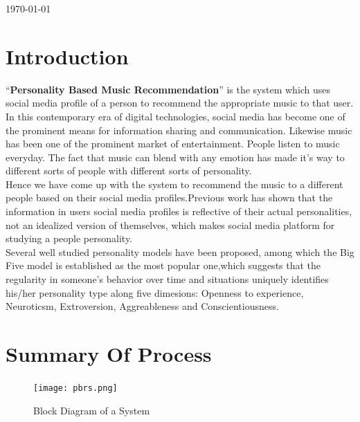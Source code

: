 \documentclass[a4paper, 12pt, onepage]{article}
\begin{document}
\begin{titlepage}
	{\normalsize \today\par}
      \end{titlepage}

      \setcounter{page}{2}
      \cleardoublepage
      {
        \setlength{\parskip}{0em}
        \renewcommand\contentsname{Table of Contents}
        \tableofcontents {}
      }


      \cleardoublepage
      \section{Introduction}
	``\textbf{Personality Based Music Recommendation}'' is the system which uses social media profile of a person to recommend the appropriate music to that user. In this contemporary era of digital technologies, social media has become one of the prominent means for information sharing and communication. Likewise music has been one of the prominent market of entertainment. People listen to music everyday. The fact that music can blend with any emotion has made it's way to different sorts of people with different sorts of personality.\\
	Hence we have come up with the system to recommend the music to a different people based on their social media profiles.Previous work has shown that the information in users social media profiles is reflective of their actual personalities, not an idealized version of themselves, which makes social media platform for studying a people personality.\\
	Several well studied personality models have been proposed, among which the Big Five model is established as the most popular one,which suggests that the regularity in someone's behavior over time and situations uniquely identifies his/her personality type along five dimesions: Openness to experience, Neuroticsm, Extroversion, Aggreableness and Conscientiousness.

      \cleardoublepage
      \section{Summary Of Process}
      \begin{figure}[ht!]
	      \texttt{[image: pbrs.png]}
		\caption{Block Diagram of a System}
	\end{figure}
\end{document}
